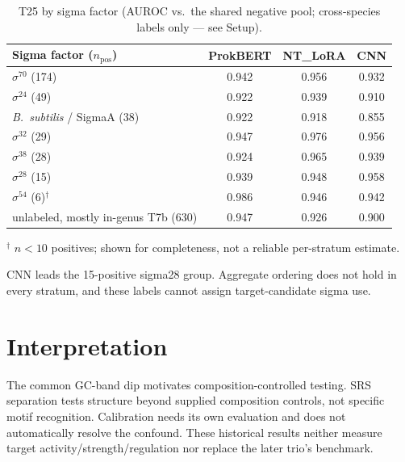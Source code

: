 \documentclass{article}
\begin{document}
\begin{table}[h]
\centering
\caption{T25 by sigma factor (AUROC vs.\ the shared negative pool; cross-species labels only --- see Setup).}
\begin{tabular}{lccc}
\toprule
Sigma factor ($n_{\text{pos}}$) & ProkBERT & NT\_LoRA & CNN \\
\midrule
$\sigma^{70}$ (174) & 0.942 & 0.956 & 0.932 \\
$\sigma^{24}$ (49)  & 0.922 & 0.939 & 0.910 \\
\emph{B.\ subtilis} / SigmaA (38) & 0.922 & 0.918 & 0.855 \\
$\sigma^{32}$ (29)  & 0.947 & 0.976 & 0.956 \\
$\sigma^{38}$ (28)  & 0.924 & 0.965 & 0.939 \\
$\sigma^{28}$ (15)  & 0.939 & 0.948 & 0.958 \\
$\sigma^{54}$ (6)$^{\dagger}$ & 0.986 & 0.946 & 0.942 \\
unlabeled, mostly in-genus T7b (630) & 0.947 & 0.926 & 0.900 \\
\bottomrule
\end{tabular}

{\footnotesize $^{\dagger}$ $n<10$ positives; shown for completeness, not a reliable per-stratum estimate.}
\end{table}

CNN leads the 15-positive sigma28 group. Aggregate ordering does not hold in every stratum, and these labels cannot assign target-candidate sigma use.

\section{Interpretation}
The common GC-band dip motivates composition-controlled testing. SRS separation tests structure beyond supplied composition controls, not specific motif recognition. Calibration needs its own evaluation and does not automatically resolve the confound. These historical results neither measure target activity/strength/regulation nor replace the later trio's benchmark.
\end{document}
